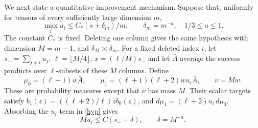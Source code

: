 \documentclass[11pt]{article}
\begin{document}
We next state a quantitative improvement mechanism. Suppose that,
uniformly for tensors of every sufficiently large dimension $m$,
\begin{equation}\label{hyp}
 \max_i u_i\le C_*(s+\delta_m)/m,\qquad
 \delta_m=m^{-a},\quad 1/3\le a\le1.
\end{equation}
The constant $C_*$ is fixed. Deleting one column gives the same
hypothesis with dimension $M=m-1$, and $\delta_M\asymp\delta_m$.
For a fixed deleted index $i$, let
$s_-=\sum_{j\ne i}u_j$, $\ell=\lfloor M/4\rfloor$,
$x=(\ell/M)s_-$ and let $\bar A$ average the success products
over $\ell$-subsets of these $M$ columns. Define
\[
 \mu_0=(\ell+1)w\bar A,\qquad
 \mu_1=(\ell+1)(\ell+2)w u_i\bar A,
 \qquad \nu=Mw.
\]
These are probability measures except that $\nu$ has mass $M$.
Their scalar targets satisfy
$b_1(z)=((\ell+2)/\ell)z b_0(z)$, and
$d\mu_1=(\ell+2)u_i\,d\mu_0$.
Absorbing the $u_i$ term in \eqref{hyp} gives
\begin{equation}\label{mark}
 M u_i\le C(s_-+\delta),\qquad\delta=M^{-a}.
\end{equation}
\end{document}
